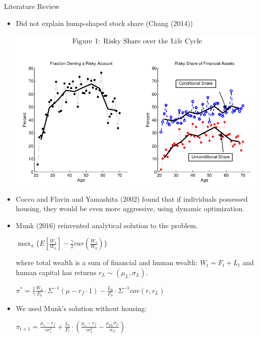 \documentclass{beamer}
\begin{document}
\begin{frame}[allowframebreaks]{Literature Review}
\begin{itemize}
	\item Did not explain hump-shaped stock share (Chang (2014))
	\begin{center}
		\includegraphics[scale=0.3]{figs/chang.png}
	\end{center}
	\item Cocco and Flavin and Yamashita (2002) found that if individuals possessed housing, they would be even more aggressive, using dynamic optimization.

\framebreak

	\item Munk (2016) reinvented analytical solution to the problem.

\begin{center}
	$ \displaystyle\max_{\pi} \{ E[\frac{W_1}{W_0}] - \frac{\gamma}{2} var(\frac{W_1}{W_0}) \} $
\end{center}

where total wealth is a sum of financial and human wealth: $W_t = F_t + L_t$ and human capital has returns $r_L \sim (\mu_L, \sigma_L)$.

\begin{center}
	$\pi^* = \frac{1}{\gamma} \frac{W_0}{F_0} \cdot \Sigma^{-1} (\mu - r_f \cdot 1) - \frac{L_0}{F_0} \cdot \Sigma^{-1} cov(r,r_L)$
\end{center}

\framebreak

	\item We used Munk's solution without housing:

\begin{center}
	$\pi_{t+1} = \frac{\mu_s - r_f}{\gamma \sigma^2_s}  + \frac{L_t}{F_t} \cdot \left(\frac{\mu_s - r_f}{\gamma \sigma^2_s} - \frac{\rho_{SL}\sigma_L}{\sigma_S} \right)$
\end{center}


\end{itemize}
\end{frame}
\end{document}
